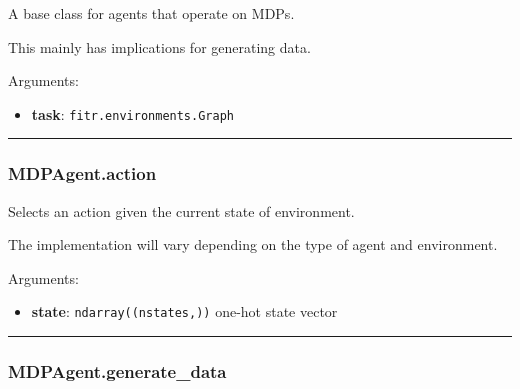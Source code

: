 A base class for agents that operate on MDPs.

This mainly has implications for generating data.

Arguments:

\begin{itemize}
\tightlist
\item
  \textbf{task}: \texttt{fitr.environments.Graph}
\end{itemize}

\begin{center}\rule{0.5\linewidth}{\linethickness}\end{center}

\subsubsection{MDPAgent.action}\label{mdpagent.action}

\begin{Shaded}
\begin{Highlighting}[]
\end{Highlighting}
\end{Shaded}

Selects an action given the current state of environment.

The implementation will vary depending on the type of agent and
environment.

Arguments:

\begin{itemize}
\tightlist
\item
  \textbf{state}: \texttt{ndarray((nstates,))} one-hot state vector
\end{itemize}

\begin{center}\rule{0.5\linewidth}{\linethickness}\end{center}

\subsubsection{MDPAgent.generate\_data}\label{mdpagent.generate_data}

\begin{Shaded}
\begin{Highlighting}[]
\end{Highlighting}
\end{Shaded}

